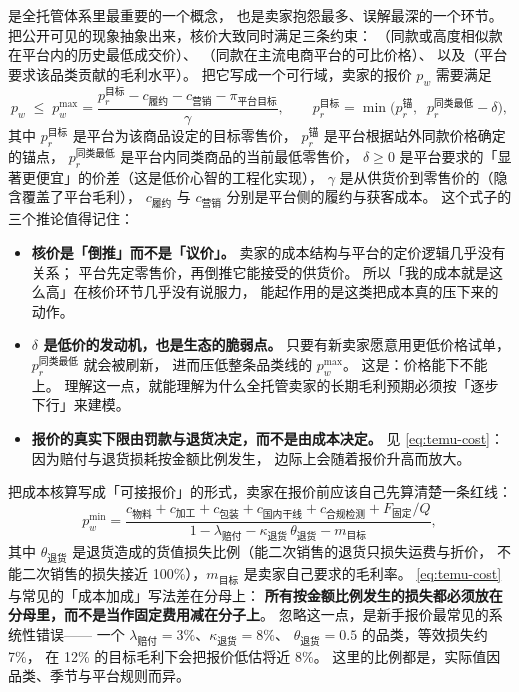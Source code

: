  是全托管体系里最重要的一个概念，
也是卖家抱怨最多、误解最深的一个环节。
把公开可见的现象抽象出来，核价大致同时满足三条约束：
（同款或高度相似款在平台内的历史最低成交价）、
（同款在主流电商平台的可比价格）、
以及（平台要求该品类贡献的毛利水平）。
把它写成一个可行域，卖家的报价 $p_{w}$ 需要满足
\begin{equation}
p_{w} \;\le\; p_{w}^{\max}
= \frac{p_{r}^{\text{目标}} - c_{\text{履约}} - c_{\text{营销}} - \pi_{\text{平台目标}}}{\gamma},
\qquad
p_{r}^{\text{目标}} = \min\Big( p_{r}^{\text{锚}},\;\; p_{r}^{\text{同类最低}} - \delta \Big),
\label{eq:temu-quote}
\end{equation}
其中 $p_{r}^{\text{目标}}$ 是平台为该商品设定的目标零售价，
$p_{r}^{\text{锚}}$ 是平台根据站外同款价格确定的锚点，
$p_{r}^{\text{同类最低}}$ 是平台内同类商品的当前最低零售价，
$\delta \ge 0$ 是平台要求的「显著更便宜」的价差（这是低价心智的工程化实现），
$\gamma$ 是从供货价到零售价的（隐含覆盖了平台毛利），
$c_{\text{履约}}$ 与 $c_{\text{营销}}$ 分别是平台侧的履约与获客成本。
这个式子的三个推论值得记住：

\begin{itemize}
  \item \textbf{核价是「倒推」而不是「议价」。} 卖家的成本结构与平台的定价逻辑几乎没有关系；
        平台先定零售价，再倒推它能接受的供货价。
        所以「我的成本就是这么高」在核价环节几乎没有说服力，
        能起作用的是这类把成本真的压下来的动作。
  \item \textbf{$\delta$ 是低价的发动机，也是生态的脆弱点。}
        只要有新卖家愿意用更低价格试单，$p_{r}^{\text{同类最低}}$ 就会被刷新，
        进而压低整条品类线的 $p_{w}^{\max}$。
        这是：价格能下不能上。
        理解这一点，就能理解为什么全托管卖家的长期毛利预期必须按「逐步下行」来建模。
  \item \textbf{报价的真实下限由罚款与退货决定，而不是由成本决定。}
        见 \cref{eq:temu-cost}：因为赔付与退货损耗按金额比例发生，
        边际上会随着报价升高而放大。
\end{itemize}

把成本核算写成「可接报价」的形式，卖家在报价前应该自己先算清楚一条红线：
\begin{equation}
p_{w}^{\min}
= \frac{c_{\text{物料}} + c_{\text{加工}} + c_{\text{包装}}
+ c_{\text{国内干线}} + c_{\text{合规检测}} + F_{\text{固定}}/Q}
{1 - \lambda_{\text{赔付}} - \kappa_{\text{退货}}\, \theta_{\text{退货}} - m_{\text{目标}}} ,
\label{eq:temu-cost}
\end{equation}
其中 $\theta_{\text{退货}}$ 是退货造成的货值损失比例（能二次销售的退货只损失运费与折价，
不能二次销售的损失接近 100\%），$m_{\text{目标}}$ 是卖家自己要求的毛利率。
\cref{eq:temu-cost} 与常见的「成本加成」写法差在分母上：
\textbf{所有按金额比例发生的损失都必须放在分母里，而不是当作固定费用减在分子上}。
忽略这一点，是新手报价最常见的系统性错误——
一个 $\lambda_{\text{赔付}} = 3\%$、$\kappa_{\text{退货}} = 8\%$、
$\theta_{\text{退货}} = 0.5$ 的品类，等效损失约 7\%，
在 12\% 的目标毛利下会把报价低估将近 8\%。
这里的比例都是，实际值因品类、季节与平台规则而异。

